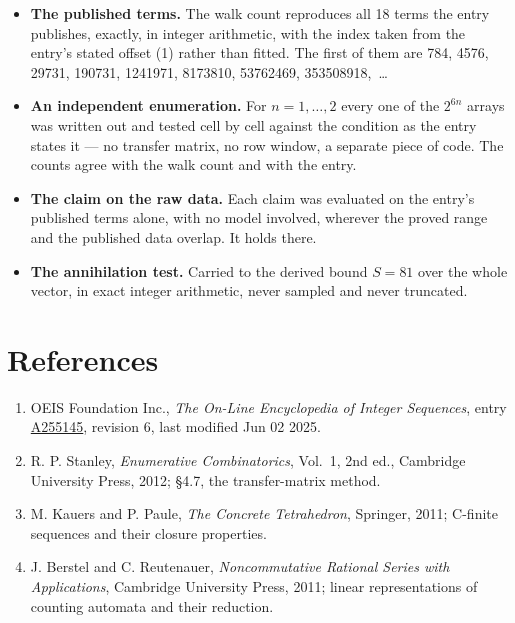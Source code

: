 \documentclass[11pt]{article}
\theoremstyle{definition}
\begin{document}
\begin{itemize}

\item {\bfseries The published terms.} The walk count reproduces all 18 terms the entry publishes, exactly, in integer arithmetic, with the index taken from the entry's stated offset (1) rather than fitted. The first of them are 784, 4576, 29731, 190731, 1241971, 8173810, 53762469, 353508918,~\dots

\item {\bfseries An independent enumeration.} For $n = 1,\dots,2$ every one of the $2^{6n}$ arrays was written out and tested cell by cell against the condition as the entry states it --- no transfer matrix, no row window, a separate piece of code. The counts agree with the walk count and with the entry.

\item {\bfseries The claim on the raw data.} Each claim was evaluated on the entry's published terms alone, with no model involved, wherever the proved range and the published data overlap. It holds there.

\item {\bfseries The annihilation test.} Carried to the derived bound $S = 81$ over the whole vector, in exact integer arithmetic, never sampled and never truncated.

\end{itemize}

\section{References}

\begin{enumerate}

\item OEIS Foundation Inc., \emph{The On-Line Encyclopedia of Integer Sequences}, entry \href{https://oeis.org/A255145}{A255145}, revision 6, last modified Jun 02 2025.

\item R. P. Stanley, \emph{Enumerative Combinatorics}, Vol.~1, 2nd ed., Cambridge University Press, 2012; \S4.7, the transfer-matrix method.

\item M. Kauers and P. Paule, \emph{The Concrete Tetrahedron}, Springer, 2011; C-finite sequences and their closure properties.

\item J. Berstel and C. Reutenauer, \emph{Noncommutative Rational Series with Applications}, Cambridge University Press, 2011; linear representations of counting automata and their reduction.

\end{enumerate}
\end{document}
